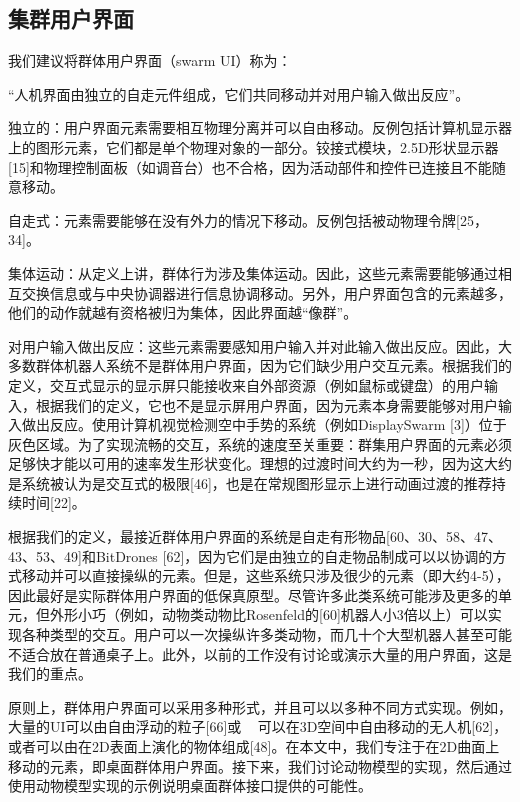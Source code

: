 \subsection{集群用户界面}

我们建议将群体用户界面（swarm UI）称为：

“人机界面由独立的自走元件组成，它们共同移动并对用户输入做出反应”。

独立的：用户界面元素需要相互物理分离并可以自由移动。反例包括计算机显示器上的图形元素，它们都是单个物理对象的一部分。铰接式模块，2.5D形状显示器[15]和物理控制面板（如调音台）也不合格，因为活动部件和控件已连接且不能随意移动。

自走式：元素需要能够在没有外力的情况下移动。反例包括被动物理令牌[25，34]。

集体运动：从定义上讲，群体行为涉及集体运动。因此，这些元素需要能够通过相互交换信息或与中央协调器进行信息协调移动。另外，用户界面包含的元素越多，他们的动作就越有资格被归为集体，因此界面越“像群”。

对用户输入做出反应：这些元素需要感知用户输入并对此输入做出反应。因此，大多数群体机器人系统不是群体用户界面，因为它们缺少用户交互元素。根据我们的定义，交互式显示的显示屏只能接收来自外部资源（例如鼠标或键盘）的用户输入，根据我们的定义，它也不是显示屏用户界面，因为元素本身需要能够对用户输入做出反应。使用计算机视觉检测空中手势的系统（例如DisplaySwarm [3]）位于灰色区域。为了实现流畅的交互，系统的速度至关重要：群集用户界面的元素必须足够快才能以可用的速率发生形状变化。理想的过渡时间大约为一秒，因为这大约是系统被认为是交互式的极限[46]，也是在常规图形显示上进行动画过渡的推荐持续时间[22]。

根据我们的定义，最接近群体用户界面的系统是自走有形物品[60、30、58、47、43、53、49]和BitDrones [62]，因为它们是由独立的自走物品制成可以以协调的方式移动并可以直接操纵的元素。但是，这些系统只涉及很少的元素（即大约4-5），因此最好是实际群体用户界面的低保真原型。尽管许多此类系统可能涉及更多的单元，但外形小巧（例如，动物类动物比Rosenfeld的[60]机器人小3倍以上）可以实现各种类型的交互。用户可以一次操纵许多类动物，而几十个大型机器人甚至可能不适合放在普通桌子上。此外，以前的工作没有讨论或演示大量的用户界面，这是我们的重点。

原则上，群体用户界面可以采用多种形式，并且可以以多种不同方式实现。例如，大量的UI可以由自由浮动的粒子[66]或
 
可以在3D空间中自由移动的无人机[62]，或者可以由在2D表面上演化的物体组成[48]。在本文中，我们专注于在2D曲面上移动的元素，即桌面群体用户界面。接下来，我们讨论动物模型的实现，然后通过使用动物模型实现的示例说明桌面群体接口提供的可能性。

